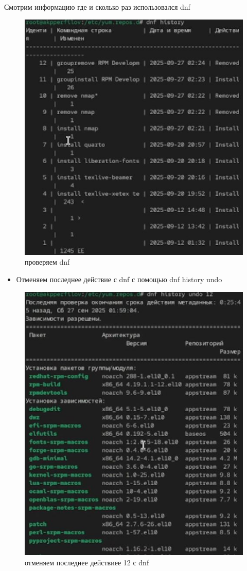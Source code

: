 \documentclass[
  english,
  russian,
  12pt,
  a4paper,
  DIV=11,
  numbers=noendperiod]{scrreprt}
\providecommand{\tightlist}{%
  \setlength{\itemsep}{0pt}\setlength{\parskip}{0pt}}
\begin{document}
Смотрим информацию где и сколько раз использовался dnf

\begin{figure}

{\centering \includegraphics[width=0.71\linewidth,height=\textheight,keepaspectratio]{image/16.jpg}

}

\caption{проверяем dnf}

\end{figure}%

\begin{itemize}
\tightlist
\item
  Отменяем последнее действие с dnf с помощью dnf history undo
\end{itemize}

\begin{figure}

{\centering \includegraphics[width=0.71\linewidth,height=\textheight,keepaspectratio]{image/17.jpg}

}

\caption{отменяем последнее действиее 12 с dnf}

\end{figure}%
\end{document}
